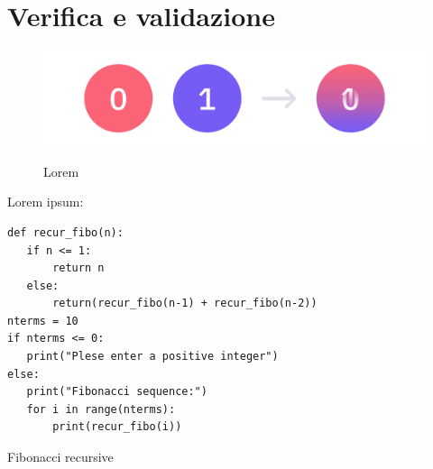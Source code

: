 \chapter{Verifica e validazione}
\label{chap:verifica-validazione}

\begin{figure}[H]
    \centering
    \includegraphics[alt={Testo alternativo dell'immagine}, width=1\columnwidth]{img/quantum_superposition.jpeg}
    \caption{Lorem}
    \label{fig:enter-label}
\end{figure}

\lipsum[1-2]

Lorem ipsum:
\begin{listing}[H]
\begin{verbatim}
def recur_fibo(n):
   if n <= 1:
       return n
   else:
       return(recur_fibo(n-1) + recur_fibo(n-2))
nterms = 10
if nterms <= 0:
   print("Plese enter a positive integer")
else:
   print("Fibonacci sequence:")
   for i in range(nterms):
       print(recur_fibo(i))
\end{verbatim}
\caption{Fibonacci recursive}
\label{listing:py_fibo}
\end{listing}

\lipsum[1]

\newpage